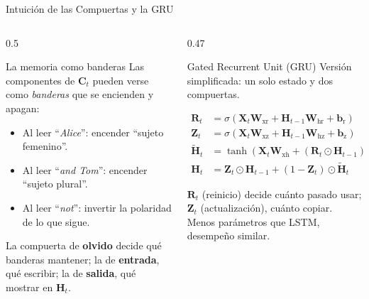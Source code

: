 \documentclass[aspectratio=169, 10pt]{beamer}
\newcommand{\W}[1]{\mathbf{W}_{\textrm{#1}}}
\newcommand{\bvec}[1]{\mathbf{b}_{\textrm{#1}}}
\newcommand{\formula}[1]{%
	\begin{tcolorbox}[colback=UCMBlue!8, colframe=UCMBlue, arc=4pt,
		boxsep=2pt, left=6pt, right=6pt, top=3pt, bottom=3pt]
		#1
	\end{tcolorbox}
}
\begin{document}
\begin{frame}{Intuici\'on de las Compuertas y la GRU}

	\begin{columns}[T]
		\begin{column}{0.5\textwidth}
			\begin{block}{La memoria como banderas}
				\small
				Las componentes de $\mathbf{C}_t$ pueden verse como \emph{banderas} que se encienden y apagan:
				\begin{itemize}
					\item Al leer ``\textit{Alice}'': encender ``sujeto femenino''.
					\item Al leer ``\textit{and Tom}'': encender ``sujeto plural''.
					\item Al leer ``\textit{not}'': invertir la polaridad de lo que sigue.
				\end{itemize}
				La compuerta de \textbf{olvido} decide qu\'e banderas mantener; la de \textbf{entrada}, qu\'e escribir; la de \textbf{salida}, qu\'e mostrar en $\mathbf{H}_t$.
			\end{block}
		\end{column}

		\begin{column}{0.47\textwidth}
			\begin{block}{Gated Recurrent Unit (GRU)}
				\small
				Versi\'on simplificada: un solo estado y dos compuertas.
				\formula{\scriptsize
					$\begin{aligned}
							\mathbf{R}_t & = \sigma(\mathbf{X}_t\W{xr} + \mathbf{H}_{t-1}\W{hr} + \bvec{r}) \\
							\mathbf{Z}_t & = \sigma(\mathbf{X}_t\W{xz} + \mathbf{H}_{t-1}\W{hz} + \bvec{z}) \\
							\tilde{\mathbf{H}}_t & = \tanh(\mathbf{X}_t\W{xh} + (\mathbf{R}_t\odot\mathbf{H}_{t-1})\W{hh} + \bvec{h}) \\
							\mathbf{H}_t & = \mathbf{Z}_t\odot\mathbf{H}_{t-1} + (1-\mathbf{Z}_t)\odot\tilde{\mathbf{H}}_t
						\end{aligned}$}
				$\mathbf{R}_t$ (reinicio) decide cu\'anto pasado usar; $\mathbf{Z}_t$ (actualizaci\'on), cu\'anto copiar. Menos par\'ametros que LSTM, desempe\~no similar.
			\end{block}
		\end{column}
	\end{columns}

\end{frame}
\end{document}
